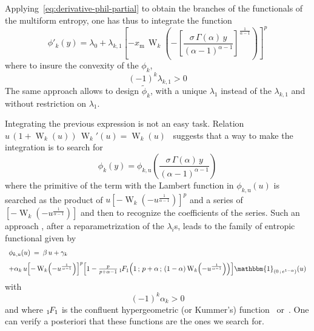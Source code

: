 \documentclass[entropy,article,submit,moreauthors,pdftex]{Definitions/mdpi}
\newcommand{\SZ}[1]{{\color{blue} #1}}                                       %
\def\un{\mathbbm{1}}%
\def\W{\operatorname{W}} %
\newcommand{\hypgeom}[2]{\mbox{}_{#1}\hspace{-1pt}F_{#2}}%
\def\u{\mathrm{u}}
\begin{document}
\SZ{Applying~\ref{eq:derivative-phil-partial}  to  obtain  the branches  of  the
  functionals  of the  multiform entropy,  one}  has thus  to \SZ{integrate  the
  function}
%
\[
\phi'_k(y) = \lambda_0  + \lambda_{k,1} \left[ - x_{\mathrm{m}}  \, \W_k\left( -
\left[    \frac{\sigma    \,   \Gamma(\alpha)    \,    y}{(\alpha-1)^{\alpha-1}}
\right]^{\frac{1}{\alpha-1}} \right) \right]^p
\]
%
where to insure the convexity of the $\phi_k$,
%
\[
(-1)^k \lambda_{k,1} > 0
\]
%
The  same  approach  allows  to   design  $\widetilde{\phi}_k$,  with  a  unique
$\lambda_1$  instead  of  the  $\lambda_{k,1}$ \SZ{and  without  restriction  on
  $\lambda_1$}.

Integrating  the previous  expression  is  not an  easy  task.   Relation $u  \,
(1+\W_k(u)) \, \W_k'(u) =  \W_k(u)$~\cite[Eq.~3.2]{CorGon96} suggests that a way
to make the  integration is to search for%
\[
\phi_k(y) = \phi_{k,\u}\left( \frac{\sigma        \,       \Gamma(\alpha) \, y}{(\alpha-1)^{\alpha-1}} \right)
\]
%
where   \SZ{the  primitive   of  the   term  with   the  Lambert   function  in}
$\phi_{k,\u}(u)$ is searched  as the product of $u  \left[- \W_k\left( -
  u^{\frac{1}{\alpha-1}}  \right)  \right]^p  $  and   a  series  of  $\left[  -
  \W_k\left( - u^{\frac{1}{\alpha-1}} \right) \right]$ and then to recognize the
coefficients of the  series. Such an approach\SZ{, after  a reparametrization of
  the $\lambda_i$s,}  leads to  the family of  entropic functional \SZ{given by}
%
\[\begin{array}{l}
\phi_{k,\u}(u) \: = \: \beta \, u + \gamma_k \\[2.5mm]
%
+  \alpha_k \,     u   \left[    -   \W_k\left(   -
  u^{\frac{1}{\alpha-1}} \right) \right]^p \left[ 1 - \frac{p}{p+\alpha-1} \,
  \hypgeom{1}{1}\left(  1 \,  ; \,  p+\alpha \,  ; \,  (1-\alpha) \W_k  \left( -
  u^{\frac{1}{\alpha-1}}  \right)   \right)  \right]  \un_{\left(  0   \,  ;  \,
  e^{1-\alpha} \right)}(u)
\end{array}\]
%
\SZ{with $$(-1)^k  \alpha_k > 0$$  and where $\hypgeom{1}{1}$ is  the confluent
hypergeometric (or Kummer's) function~\cite[\S~13]{AbrSte70} or~\cite[\S~9.2]{GraRyz15}}.
One  can
verify  a posteriori  that these  functions  are the  ones we  search for.
\end{document}
